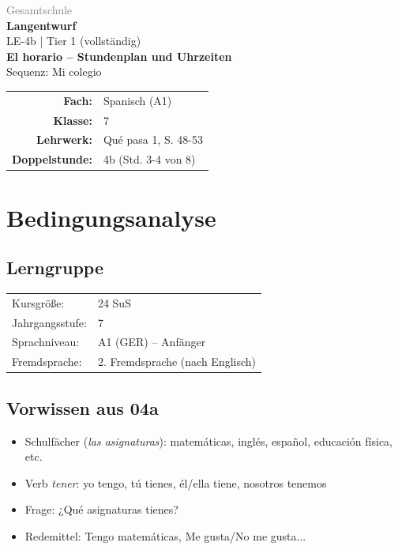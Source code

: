 \documentclass[11pt,a4paper]{article}
\newcommand{\fach}{Spanisch}
\newcommand{\jahrgangsstufe}{7}
\newcommand{\schulart}{Gesamtschule}
\newcommand{\stundenthema}{El horario -- Stundenplan und Uhrzeiten}
\newcommand{\reihenthema}{Mi colegio}
\newcommand{\stundennummer}{4b}
\newcommand{\lehrwerk}{Qué pasa 1}
\newcommand{\lehrwerkseite}{S. 48-53}
\newcommand{\lerngruppengroesse}{24}
\begin{document}
\begin{titlepage}
    \centering
    \vspace*{2cm}
    {\large\textcolor{gray}{\schulart}}\\[2cm]
    {\Huge\textcolor{fach}{\textbf{Langentwurf}}}\\[0.5cm]
    {\large LE-\stundennummer{} | Tier 1 (vollständig)}\\[2cm]
    {\LARGE\textbf{\stundenthema}}\\[0.5cm]
    {\large Sequenz: \reihenthema}\\[2cm]
    \begin{tabular}{rl}
        \textbf{Fach:} & \fach{} (A1) \\[0.3cm]
        \textbf{Klasse:} & \jahrgangsstufe \\[0.3cm]
        \textbf{Lehrwerk:} & \lehrwerk, \lehrwerkseite \\[0.3cm]
        \textbf{Doppelstunde:} & \stundennummer{} (Std. 3-4 von 8) \\[0.3cm]
    \end{tabular}
    \vfill
\end{titlepage}

\tableofcontents
\newpage

\section{Bedingungsanalyse}

\subsection{Lerngruppe}
\begin{tabular}{ll}
    Kursgröße: & \lerngruppengroesse{} SuS \\
    Jahrgangsstufe: & \jahrgangsstufe \\
    Sprachniveau: & A1 (GER) -- Anfänger \\
    Fremdsprache: & 2. Fremdsprache (nach Englisch) \\
\end{tabular}

\subsection{Vorwissen aus 04a}
\begin{itemize}
    \item Schulfächer (\textit{las asignaturas}): matemáticas, inglés, español, educación física, etc.
    \item Verb \textit{tener}: yo tengo, tú tienes, él/ella tiene, nosotros tenemos
    \item Frage: ¿Qué asignaturas tienes?
    \item Redemittel: Tengo matemáticas, Me gusta/No me gusta...
\end{itemize}
\end{document}
